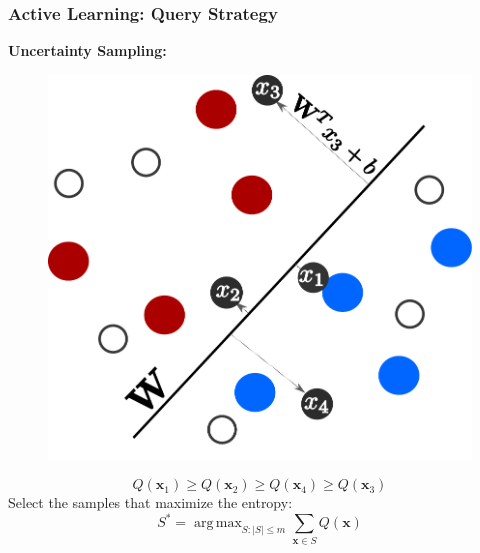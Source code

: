 \documentclass[11pts]{beamer}
\DeclareMathOperator*{\argmax}{arg\,max}
\begin{document}
\begin{frame}%
\frametitle{Active Learning: Query Strategy}
\textbf{Uncertainty Sampling:}

\vspace{0.5cm}
\begin{minipage}{0.45\textwidth}
\begin{figure}
  \begin{center}
    \includegraphics[scale=0.35]{IM/UN_M.pdf}
  \end{center}
\end{figure}
\end{minipage}
\hfill
\begin{minipage}{0.5\textwidth}

\begin{equation*}
    Q(\mathbf{x}_1)\geq Q(\mathbf{x}_2)\geq Q(\mathbf{x}_4)\geq Q(\mathbf{x}_3) 
\end{equation*}
Select the samples that maximize the entropy:
\begin{equation}
    S^{*}=\argmax_{S:|S|\leq m} \sum_{\mathbf{x}\in S} Q(\mathbf{x})
\end{equation}

\end{minipage}
\end{frame}
\end{document}
